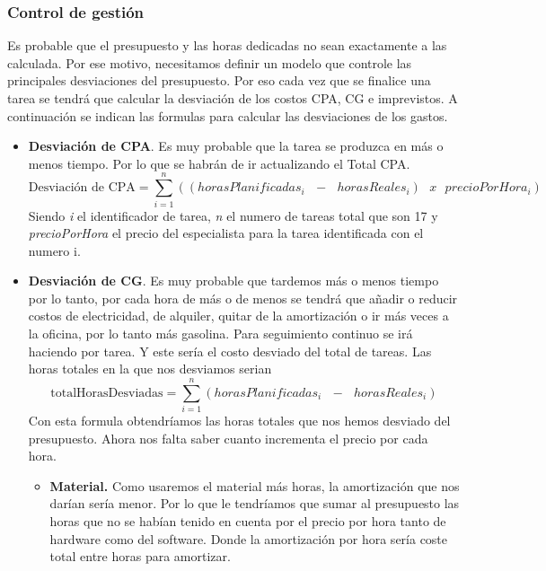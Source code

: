 \documentclass[12pt]{article}
\begin{document}
    \subsubsection{Control de gestión}\label{sec:controldegestion}
    Es probable que el presupuesto y las horas dedicadas no sean exactamente a las calculada. Por ese motivo, necesitamos definir un modelo que controle las principales desviaciones del presupuesto.
    Por eso cada vez que se finalice una tarea se tendrá que calcular la desviación de los costos CPA, CG e imprevistos.
    A continuación se indican las formulas para calcular las desviaciones de los gastos.
     \begin{itemize}
            \item \textbf{Desviación de CPA}. Es muy probable que la tarea se produzca en más o menos tiempo. Por lo que se habrán de ir actualizando el Total CPA.
                \begin{equation*}
                    \text{Desviación de CPA} = \sum_{i=1}^n((horasPlanificadas_{i} \text{ }- \text{ }horasReales_{i})\text{ } x \text{ } precioPorHora_{i})
                \end{equation*}
                Siendo \textit{i} el identificador de tarea, \textit{n} el numero de tareas total que son 17 y \textit{precioPorHora} el precio del especialista para la tarea identificada con el numero i.
            \item \textbf{Desviación de CG}. Es muy probable que tardemos más o menos tiempo por lo tanto, por cada hora de más o de menos se tendrá que añadir o reducir costos de electricidad, de alquiler, quitar de la amortización o ir más veces a la oficina, por lo tanto más gasolina. Para seguimiento continuo se irá haciendo por tarea. Y este sería el costo desviado del total de tareas.
            Las horas totales en la que nos desviamos serian
            \begin{equation*}
                \text{totalHorasDesviadas} = \sum_{i=1}^n(horasPlanificadas_{i} \text{ }- \text{ }horasReales_{i})
            \end{equation*}
            Con esta formula obtendríamos las horas totales que nos hemos desviado del presupuesto. Ahora nos falta saber cuanto incrementa el precio por cada hora.
            \begin{itemize}
                \item \textbf{Material.} Como usaremos el material más horas, la amortización que nos darían sería menor. Por lo que le tendríamos que sumar al presupuesto las horas que no se habían tenido en cuenta por el precio por hora tanto de hardware como del software. Donde la amortización por hora sería coste total entre horas para amortizar.

\end{itemize}
\end{itemize}
\end{document}
